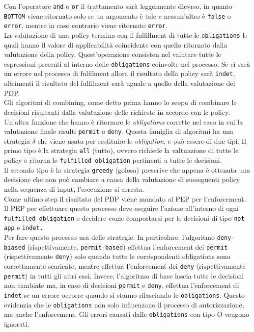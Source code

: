 Con l'operatore \texttt{and} o \texttt{or} il trattamento sarà leggermente dievrso, in quanto \texttt{BOTTOM} viene ritornato solo se un argomento è tale e nessun'altro è \texttt{false} o \texttt{error}, mentre in caso contrario viene ritornato \texttt{error}.\\
La valutazione di una policy termina con il fulfillment di tutte le \texttt{obligations} le quali hanno il valore di applicabilità coincidente con quello ritornato dalla valutazione della policy. Quest'operazione consisten nel valutare tutte le espressioni presenti al interno delle \texttt{obligations} coinvolte nel processo. Se ci sarà un errore nel processo di fulfilment allora il risultato della policy sarà \texttt{indet}, altrimenti il risultato del fulfilment sarà uguale a quello della valutazione del PDP.\\
Gli algoritmi di combining, come detto prima hanno lo scopo di combinare le decisioni risultanti dalla valutazione delle richieste in accordo con le policy. Un'altra funzione che hanno è ritornare le \textit{obligations} corrette nel caso in cui la valutazione finale risulti \texttt{permit} o \texttt{deny}. Questa famiglia di algoritmi ha una strategia $\delta$ che viene usata per restituire le \textit{obligation}, e può essere di due tipi.
Il primo tipo è la strategia \texttt{all} (tutto), ovvero richiede la valtuazione di tutte le policy e ritorna le \texttt{fulfilled obligation} pertinenti a tutte le decisioni.\\
Il secondo tipo è la strategia \texttt{greedy} (golosa) prescrive che appena è ottenuta una decisione che non può cambiare a causa della valutazione di susseguenti policy nella sequenza di input, l'esecuzione si arresta.\\
Come ultimo step il risultato del PDP viene mandato al PEP per l'enforcement.
Il PEP per effettuare questo processo deve eseguire l'azione all'interno di ogni \texttt{fulfilled obligation} e decidere come comportarsi per le decisioni di tipo \texttt{not-app} e \texttt{indet.}\\
Per fare questo processo usa delle strategie. In particolare, l'algoritmo \texttt{deny-biased} (rispettivamente, \texttt{permit-based}) effettua l'enforcement dei \texttt{permit} (rispettivamente \texttt{deny}) solo quando tutte le corrispondenti obligations sono correttamente scaricate, mentre effettua l'enforcement dei \texttt{deny} (rispettivamente \texttt{permit}) in tutti gli altri casi. Invece, l'algoritmo di base lascia tutte le decisioni non cambiate ma, in caso di decisioni \texttt{permit} e \texttt{deny}, effettua l'enforcement di \texttt{indet} se un errore occorre quando si stanno rilasciando le \texttt{obligations}. Questo evidenzia che le \texttt{obligations} non solo influenzano il processo di autorizzazione, ma anche l'enforcement. Gli errori causati dalle \texttt{obligations} con tipo O vengono ignorati.


